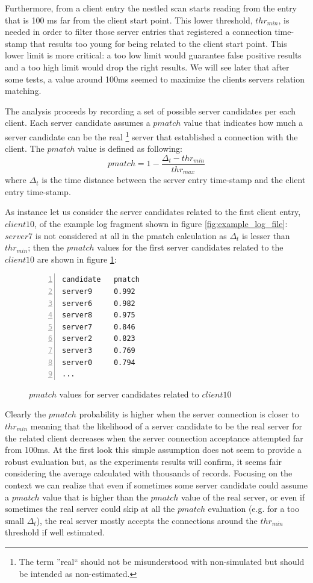 Furthermore, from a client
entry the nestled scan starts reading from the entry that is 100 ms far
from the client start point. This lower threshold, $thr_{min}$, is needed in order to
 filter those server entries that registered a connection time-stamp
that results too young for being related to the client start point. This
lower limit is more critical: a too low limit would guarantee false
positive results and a too high limit would drop the right results.
We will see later that after some tests, a value around 100ms seemed to maximize 
the clients servers relation matching. %

The analysis proceeds by recording a set of possible server candidates 
 per each client. Each server candidate assumes a $pmatch$ value that
indicates how much a server candidate can be the real
\footnote{The term ''real`` should not be misunderstood with
non-simulated but should be intended as non-estimated.}
 server that
established a connection with the client. The $pmatch$ value is defined
as following:
\begin{equation}
pmatch = 1 - \frac{\Delta_t - thr_{min}}{thr_{max}}
\end{equation}
where $\Delta_t$ is the time distance between the server entry time-stamp and
the client entry time-stamp.

As instance let us consider the server candidates related to the first
client entry, $client10$, of the example log
fragment shown in figure \ref{fig:example_log_file}: 
$server7$ is not considered at all in the pmatch calculation  as $\Delta_t$ 
is lesser than $thr_{min}$; then the $pmatch$ values for the first server
candidates related to the $client10$ are shown in figure \ref{fig:pmatch}:
\begin{figure}[h]
\begin{lstlisting}[language=bash,frame=single, numbers=left]
candidate 	pmatch
server9 	0.992
server6 	0.982
server8 	0.975
server7  	0.846
server2  	0.823 
server3  	0.769
server0  	0.794
...
\end{lstlisting}
\caption{$pmatch$ values for server candidates related to $client10$}
\label{fig:pmatch}
\end{figure}

Clearly the $pmatch$ probability is higher when the server connection is
closer to $thr_{min}$ meaning that the likelihood of a server
candidate to be the real server for the related client decreases when
the server connection acceptance attempted far from 100ms. At the
first look this simple
assumption does not seem to provide a robust evaluation but, as the
experiments results will confirm, it seems fair considering the average
calculated with thousands of records. Focusing on the context we can realize that 
even if sometimes some server candidate could assume a $pmatch$ value
that is higher than the $pmatch$ value of the real server, or even if sometimes the
real server could skip at all the $pmatch$ evaluation (e.g.
for a too small $\Delta_t$), the real server mostly accepts
the connections around the $thr_{min}$ threshold if well
estimated.

